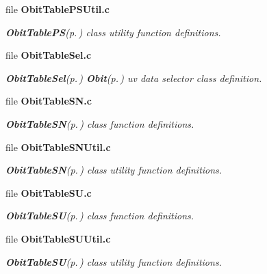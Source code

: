 \begin{CompactItemize}
\item 
file {\bf Obit\-Table\-PSUtil.c}
\begin{CompactList}\small\item\em {\bf Obit\-Table\-PS}{\rm (p.\,\pageref{structObitTablePS})} class utility function definitions. \item\end{CompactList}

\item 
file {\bf Obit\-Table\-Sel.c}
\begin{CompactList}\small\item\em {\bf Obit\-Table\-Sel}{\rm (p.\,\pageref{structObitTableSel})} {\bf Obit}{\rm (p.\,\pageref{structObit})} uv data selector class definition. \item\end{CompactList}

\item 
file {\bf Obit\-Table\-SN.c}
\begin{CompactList}\small\item\em {\bf Obit\-Table\-SN}{\rm (p.\,\pageref{structObitTableSN})} class function definitions. \item\end{CompactList}

\item 
file {\bf Obit\-Table\-SNUtil.c}
\begin{CompactList}\small\item\em {\bf Obit\-Table\-SN}{\rm (p.\,\pageref{structObitTableSN})} class utility function definitions. \item\end{CompactList}

\item 
file {\bf Obit\-Table\-SU.c}
\begin{CompactList}\small\item\em {\bf Obit\-Table\-SU}{\rm (p.\,\pageref{structObitTableSU})} class function definitions. \item\end{CompactList}

\item 
file {\bf Obit\-Table\-SUUtil.c}
\begin{CompactList}\small\item\em {\bf Obit\-Table\-SU}{\rm (p.\,\pageref{structObitTableSU})} class utility function definitions. \item\end{CompactList}


\end{CompactItemize}
